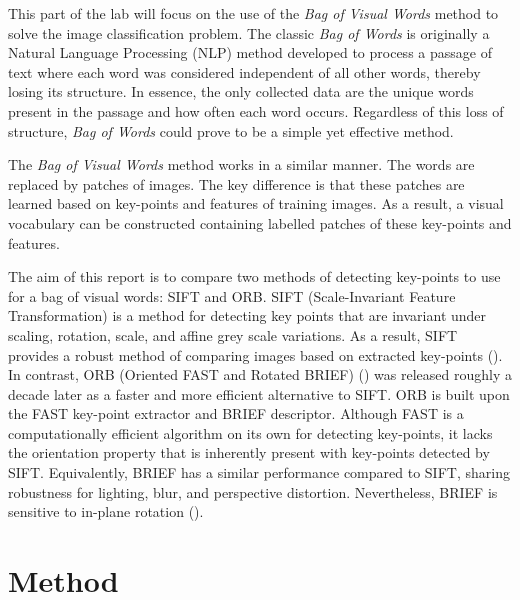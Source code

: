 \documentclass[12pt,a4paper,oneside]{paper}
\begin{document}
This part of the lab will focus on the use of the \textit{Bag of Visual Words} method to solve the image classification problem.
The classic \textit{Bag of Words} is originally a Natural Language Processing (NLP) method developed to process a passage of text where each word was considered independent of all other words, thereby losing its structure.
In essence, the only collected data are the unique words present in the passage and how often each word occurs. 
Regardless of this loss of structure, \textit{Bag of Words} could prove to be a simple yet effective method.

The \textit{Bag of Visual Words} method works in a similar manner. 
The words are replaced by patches of images.
The key difference is that these patches are learned based on key-points and features of training images.
As a result, a visual vocabulary can be constructed containing labelled patches of these key-points and features.

The aim of this report is to compare two methods of detecting key-points to use for a bag of visual words: SIFT and ORB.
SIFT (Scale-Invariant Feature Transformation) is a method for detecting key points that are invariant under scaling, rotation, scale, and affine grey scale variations.
As a result, SIFT provides a robust method of comparing images based on extracted key-points (\cite{Lowe_2004}).
In contrast, ORB (Oriented FAST and Rotated BRIEF) (\cite{6126544}) was released roughly a decade later as a faster and more efficient alternative to SIFT.
ORB is built upon the FAST key-point extractor and BRIEF descriptor.
Although FAST is a computationally efficient algorithm on its own for detecting key-points, it lacks the orientation property that is inherently present with key-points detected by SIFT.
Equivalently, BRIEF has a similar performance compared to SIFT, sharing robustness for lighting, blur, and perspective distortion.
Nevertheless, BRIEF is sensitive to in-plane rotation (\cite{Hutchison_Kanade_Kittler_Kleinberg_Mattern_Mitchell_Naor_Nierstrasz_PanduRangan_Steffen_et_al._2010}).

\newpage
\section{Method}
\end{document}
